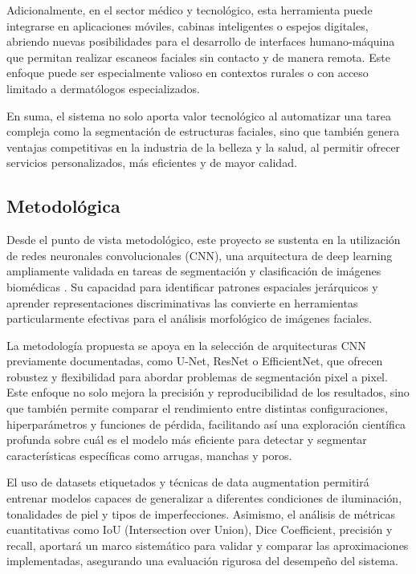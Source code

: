 Adicionalmente, en el sector médico y tecnológico, esta herramienta puede integrarse en aplicaciones móviles, cabinas inteligentes o espejos digitales, abriendo nuevas posibilidades para el desarrollo de interfaces humano-máquina que permitan realizar escaneos faciales sin contacto y de manera remota. Este enfoque puede ser especialmente valioso en contextos rurales o con acceso limitado a dermatólogos especializados.

En suma, el sistema no solo aporta valor tecnológico al automatizar una tarea compleja como la segmentación de estructuras faciales, sino que también genera ventajas competitivas en la industria de la belleza y la salud, al permitir ofrecer servicios personalizados, más eficientes y de mayor calidad.

\subsection{Metodológica}

Desde el punto de vista metodológico, este proyecto se sustenta en la utilización de redes neuronales convolucionales (CNN), una arquitectura de deep learning ampliamente validada en tareas de segmentación y clasificación de imágenes biomédicas \parencite{ronneberger2015}. Su capacidad para identificar patrones espaciales jerárquicos y aprender representaciones discriminativas las convierte en herramientas particularmente efectivas para el análisis morfológico de imágenes faciales.

La metodología propuesta se apoya en la selección de arquitecturas CNN previamente documentadas, como U-Net, ResNet o EfficientNet, que ofrecen robustez y flexibilidad para abordar problemas de segmentación pixel a pixel. Este enfoque no solo mejora la precisión y reproducibilidad de los resultados, sino que también permite comparar el rendimiento entre distintas configuraciones, hiperparámetros y funciones de pérdida, facilitando así una exploración científica profunda sobre cuál es el modelo más eficiente para detectar y segmentar características específicas como arrugas, manchas y poros.

El uso de datasets etiquetados y técnicas de data augmentation permitirá entrenar modelos capaces de generalizar a diferentes condiciones de iluminación, tonalidades de piel y tipos de imperfecciones. Asimismo, el análisis de métricas cuantitativas como IoU (Intersection over Union), Dice Coefficient, precisión y recall, aportará un marco sistemático para validar y comparar las aproximaciones implementadas, asegurando una evaluación rigurosa del desempeño del sistema.


